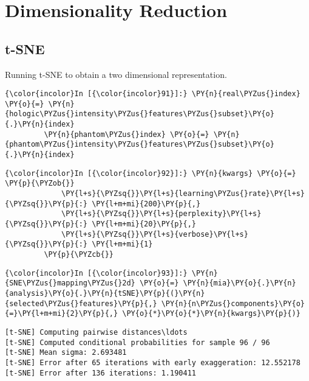     \section{Dimensionality Reduction}\label{dimensionality-reduction}

\subsection{t-SNE}\label{t-sne}

Running t-SNE to obtain a two dimensional representation.

    \begin{Verbatim}[commandchars=\\\{\}]
{\color{incolor}In [{\color{incolor}91}]:} \PY{n}{real\PYZus{}index} \PY{o}{=} \PY{n}{hologic\PYZus{}intensity\PYZus{}features\PYZus{}subset}\PY{o}{.}\PY{n}{index}
         \PY{n}{phantom\PYZus{}index} \PY{o}{=} \PY{n}{phantom\PYZus{}intensity\PYZus{}features\PYZus{}subset}\PY{o}{.}\PY{n}{index}
\end{Verbatim}

    \begin{Verbatim}[commandchars=\\\{\}]
{\color{incolor}In [{\color{incolor}92}]:} \PY{n}{kwargs} \PY{o}{=} \PY{p}{\PYZob{}}
             \PY{l+s}{\PYZsq{}}\PY{l+s}{learning\PYZus{}rate}\PY{l+s}{\PYZsq{}}\PY{p}{:} \PY{l+m+mi}{200}\PY{p}{,}
             \PY{l+s}{\PYZsq{}}\PY{l+s}{perplexity}\PY{l+s}{\PYZsq{}}\PY{p}{:} \PY{l+m+mi}{20}\PY{p}{,}
             \PY{l+s}{\PYZsq{}}\PY{l+s}{verbose}\PY{l+s}{\PYZsq{}}\PY{p}{:} \PY{l+m+mi}{1}
         \PY{p}{\PYZcb{}}
\end{Verbatim}

    \begin{Verbatim}[commandchars=\\\{\}]
{\color{incolor}In [{\color{incolor}93}]:} \PY{n}{SNE\PYZus{}mapping\PYZus{}2d} \PY{o}{=} \PY{n}{mia}\PY{o}{.}\PY{n}{analysis}\PY{o}{.}\PY{n}{tSNE}\PY{p}{(}\PY{n}{selected\PYZus{}features}\PY{p}{,} \PY{n}{n\PYZus{}components}\PY{o}{=}\PY{l+m+mi}{2}\PY{p}{,} \PY{o}{*}\PY{o}{*}\PY{n}{kwargs}\PY{p}{)}
\end{Verbatim}

    \begin{Verbatim}[commandchars=\\\{\}]
[t-SNE] Computing pairwise distances\ldots
[t-SNE] Computed conditional probabilities for sample 96 / 96
[t-SNE] Mean sigma: 2.693481
[t-SNE] Error after 65 iterations with early exaggeration: 12.552178
[t-SNE] Error after 136 iterations: 1.190411
    \end{Verbatim}

